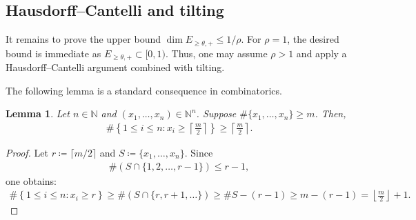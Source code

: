 \documentclass[12pt,reqno]{amsart}
\theoremstyle{definition}
\theoremstyle{plain}
\newtheorem{lemma}{Lemma}
\begin{document}
\subsection{Hausdorff--Cantelli and tilting}

It remains to prove the upper bound $\dim E_{\geq \theta,+}\leq 1/\rho$. For $\rho=1$, the desired bound is immediate as $E_{\geq \theta,+}\subset[0,1)$. Thus, one may assume $\rho>1$ and apply a Hausdorff--Cantelli argument combined with tilting.

The following lemma is a standard consequence in combinatorics.
\begin{lemma}\label{lem:distinctforceslarge}
Let $n\in\mathbb{N}$ and $(x_1,\ldots,x_n)\in\mathbb{N}^n$. Suppose $\#\{x_1,\ldots,x_n\}\geq m$. Then,
\begin{align*}
    \#\left\{1\leq i\leq n: x_i\geq \left\lceil\frac{m}{2}\right\rceil \right\}
    \geq \left\lceil\frac{m}{2}\right\rceil.
\end{align*}
\end{lemma}
\begin{proof}
Let $r\coloneqq \lceil m/2\rceil$ and $S\coloneqq\{x_1,\ldots,x_n\}$. Since
\begin{align*}
    \#\left(S\cap\{1,2,\ldots,r-1\}\right)\leq r-1,
\end{align*}
one obtains:
\begin{align*}
    \#\left\{1\leq i\leq n: x_i\geq r \right\}
    \geq\#\left(S\cap\{r,r+1,\ldots\}\right)
    \geq\#S-(r-1)
    \geq m-(r-1)
    =\left\lfloor\frac{m}{2}\right\rfloor+1.
\end{align*}
\end{proof}
\end{document}
